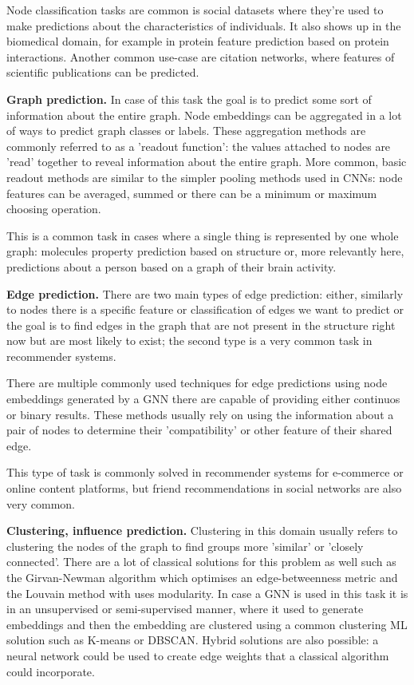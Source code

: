 	Node classification tasks are common is social datasets where they're used to make predictions about the characteristics of individuals. It also shows up in the biomedical domain, for example in protein feature prediction based on protein interactions\cite{xu2024graph}. Another common use-case are citation networks, where features of scientific publications can be predicted\cite{liu2022deep}.
	
	\textbf{Graph prediction.} In case of this task the goal is to predict some sort of information about the entire graph. Node embeddings can be aggregated in a lot of ways to predict graph classes or labels. These aggregation methods are commonly referred to as a 'readout function': the values attached to nodes are 'read' together to reveal information about the entire graph. More common, basic readout methods are similar to the simpler pooling methods used in CNNs: node features can be averaged, summed or there can be a minimum or maximum choosing operation. 
	
	This is a common task in cases where a single thing is represented by one whole graph: molecules property prediction based on structure\cite{wieder2020compact} or, more relevantly here, predictions about a person based on a graph of their brain activity\cite{wang2021graph}\cite{li2021braingnn}.
	
	\textbf{Edge prediction.} There are two main types of edge prediction: either, similarly to nodes there is a specific feature or classification of edges we want to predict or the goal is to find edges in the graph that are not present in the structure right now but are most likely to exist; the second type is a very common task in recommender systems.
	
	There are multiple commonly used techniques for edge predictions using node embeddings generated by a GNN there are capable of providing either continuos or binary results. These methods usually rely on using the information about a pair of nodes to determine their 'compatibility' or other feature of their shared edge\cite{li2023evaluating}.
	
	This type of task is commonly solved in recommender systems for e-commerce or online content platforms\cite{wu2022graph}, but friend recommendations in social networks are also very common\cite{fan2019graph}. 
	
	\textbf{Clustering, influence prediction.} Clustering in this domain usually refers to clustering the nodes of the graph to find groups more 'similar' or 'closely connected'. There are a lot of classical solutions for this problem as well such as the Girvan-Newman algorithm\cite{newman2004finding} which optimises an edge-betweenness metric and the Louvain method\cite{blondel2008fast} with uses modularity. In case a GNN is used in this task it is in an unsupervised or semi-supervised manner, where it used to generate embeddings and then the embedding are clustered using a common clustering ML solution such as K-means or DBSCAN\cite{ester1996density}. Hybrid solutions are also possible: a neural network could be used to create edge weights that a classical algorithm could incorporate.
	
